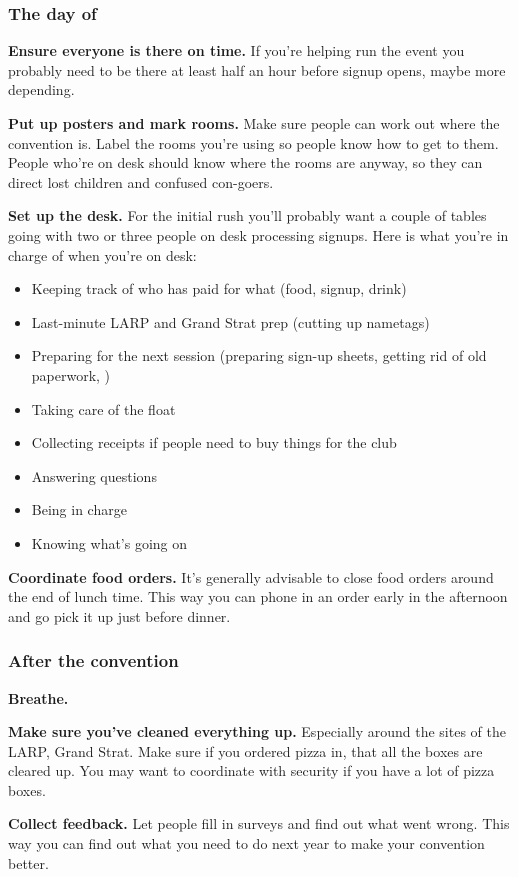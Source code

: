 \subsubsection{The day of}

\textbf{Ensure everyone is there on time.} If you're helping run the event you probably need to be there at least half an hour before signup opens, maybe more depending.

\textbf{Put up posters and mark rooms.} Make sure people can work out where the convention is. Label the rooms you're using so people know how to get to them. People who're on desk should know where the rooms are anyway, so they can direct lost children and confused con-goers.

\textbf{Set up the desk.} For the initial rush you'll probably want a couple of tables going with two or three people on desk processing signups. Here is what you're in charge of when you're on desk:

\begin{itemize}
  \item Keeping track of who has paid for what (food, signup, drink)
  \item Last-minute LARP and Grand Strat prep (\eg cutting up nametags)
  \item Preparing for the next session (preparing sign-up sheets, getting rid of old paperwork, \etc)
  \item Taking care of the float
  \item Collecting receipts if people need to buy things for the club
  \item Answering questions
  \item Being in charge
  \item Knowing what's going on
\end{itemize}

\textbf{Coordinate food orders.} It's generally advisable to close food orders around the end of lunch time. This way you can phone in an order early in the afternoon and go pick it up just before dinner.

\subsubsection{After the convention}

\textbf{Breathe.}

\textbf{Make sure you've cleaned everything up.} Especially around the sites of the LARP, Grand Strat. Make sure if you ordered pizza in, that all the boxes are cleared up. You may want to coordinate with security if you have a lot of pizza boxes.

\textbf{Collect feedback.} Let people fill in surveys and find out what went wrong. This way you can find out what you need to do next year to make your convention better.